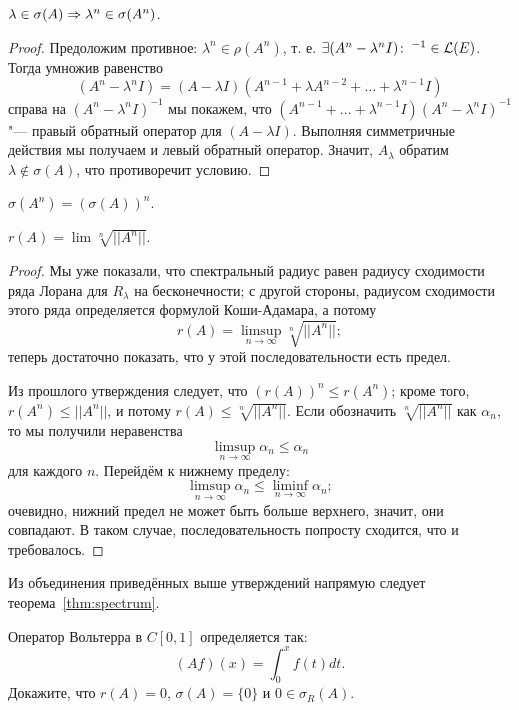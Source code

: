 \documentclass[main]{subfiles}
\begin{document}
\begin{proposition} %
  \( \lambda \in \sigma(A) \Rightarrow \lambda^n \in \sigma(A^n) \).
\end{proposition}

\begin{proof}
  Предоложим противное: \( \lambda^n \in \rho(A^n) \), т. е.
  \( \Exists {(A^n - \lambda^n I)}^{-1} \in \Linears{E} \).
  Тогда умножив равенство
  \[
    (A^n - \lambda^n I) = (A - \lambda I)
    (A^{n -1} + \lambda A^{n-2} + \dots + \lambda^{n-1} I)
  \]
  справа на \( {(A^n - \lambda^n I)}^{-1} \) мы покажем,
  что \( (A^{n -1} + \dots + \lambda^{n-1} I) {(A^n - \lambda^n I)}^{-1} \)
  "--- правый обратный оператор для \( (A - \lambda I) \).
  Выполняя симметричные действия мы получаем и левый обратный оператор.
  Значит, \( A_\lambda \) обратим \( \lambda \notin \sigma(A) \),
  что противоречит условию.
\end{proof}

\begin{exercise}
  \( \sigma(A^n) = {(\sigma(A))}^n \).
\end{exercise}

\begin{proposition}
  $ r(A) = \lim \sqrt[n]{||A^n||} $.
\end{proposition}
\begin{proof}
  Мы уже показали, что спектральный радиус равен радиусу сходимости
  ряда Лорана для \( R_\lambda \) на бесконечности;
  с другой стороны, радиусом сходимости этого ряда определяется
  формулой Коши-Адамара, а потому
  \[
    r(A) = \limsup_{n \to \infty} \sqrt[n]{||A^n||};
  \]
  теперь достаточно показать, что у этой последовательности есть предел.

  Из прошлого утверждения следует,
  что \( {\left( r(A) \right)}^n \le r(A^n) \);
  кроме того, \( r(A^n) \le ||A^n|| \),
  и потому \( r(A) \le \sqrt[n]{||A^n||} \).
  Если обозначить \( \sqrt[n]{||A^n||} \) как \( \alpha_n \),
  то мы получили неравенства
  \[
    \limsup_{n \to \infty} \alpha_n \le \alpha_n
  \]
  для каждого \( n \). Перейдём к нижнему пределу:
  \[
    \limsup_{n \to \infty} \alpha_n \le \liminf_{n \to \infty} \alpha_n;
  \]
  очевидно, нижний предел не может быть больше верхнего,
  значит, они совпадают. В таком случае,
  последовательность попросту сходится,
  что и требовалось.
\end{proof}

Из объединения приведённых выше утверждений
напрямую следует теорема~\ref{thm:spectrum}.

\begin{exercise}
  Оператор Вольтерра в \( C[0, 1] \) определяется так:
  \[ (Af)(x) = \int_{0}^x f(t) dt. \]
  Докажите, что \( r(A) = 0 \), \( \sigma(A) = \{ 0 \} \)
  и \( 0 \in \sigma_R(A) \).
\end{exercise}
 
\end{document}
